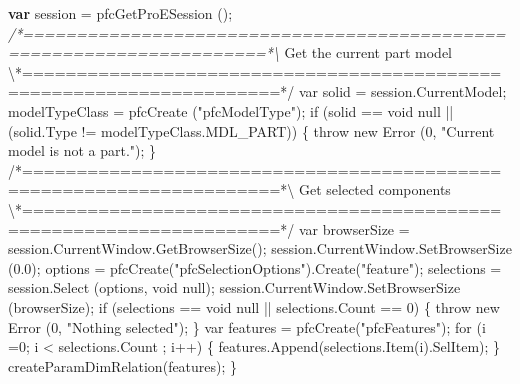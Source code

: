 \documentclass[]{article}
\newenvironment{Shaded}{}{}
\newcommand{\KeywordTok}[1]{\textcolor[rgb]{0.00,0.44,0.13}{\textbf{{#1}}}}
\newcommand{\FloatTok}[1]{\textcolor[rgb]{0.25,0.63,0.44}{{#1}}}
\newcommand{\CommentTok}[1]{\textcolor[rgb]{0.38,0.63,0.69}{\textit{{#1}}}}
\newcommand{\OtherTok}[1]{\textcolor[rgb]{0.00,0.44,0.13}{{#1}}}
\newcommand{\FunctionTok}[1]{\textcolor[rgb]{0.02,0.16,0.49}{{#1}}}
\newcommand{\NormalTok}[1]{{#1}}
\begin{document}
\begin{Shaded}
\begin{Highlighting}[]
    \KeywordTok{var} \NormalTok{session = }\FunctionTok{pfcGetProESession} \NormalTok{();}
    \CommentTok{/*=====================================================================*\textbackslash{}}
    \NormalTok{Get the current part model}
    \NormalTok{\textbackslash{}*=====================================================================*}\OtherTok{/      }
\OtherTok{    var solid = session.CurrentModel;}
\OtherTok{    modelTypeClass = pfcCreate }\FloatTok{(}\OtherTok{"pfcModelType"}\FloatTok{)}\OtherTok{;}
\OtherTok{    }
\OtherTok{    if }\FloatTok{(}\OtherTok{solid == void null }\FloatTok{||}\OtherTok{ }\FloatTok{(}\OtherTok{solid.Type != modelTypeClass.MDL_PART}\FloatTok{))}
\OtherTok{    \{}
\OtherTok{        throw new Error  }\FloatTok{(}\OtherTok{0, "Current model is not a part."}\FloatTok{)}\OtherTok{;}
\OtherTok{    \}}
\OtherTok{      }
\OtherTok{    /}\NormalTok{*=====================================================================*\textbackslash{}}
        \NormalTok{Get selected components}
    \NormalTok{\textbackslash{}*=====================================================================*}\OtherTok{/               }
\OtherTok{    var browserSize = session.CurrentWindow.GetBrowserSize}\FloatTok{()}\OtherTok{;}
\OtherTok{    session.CurrentWindow.SetBrowserSize }\FloatTok{(}\OtherTok{0.0}\FloatTok{)}\OtherTok{;}
\OtherTok{    }
\OtherTok{    options = pfcCreate}\FloatTok{(}\OtherTok{"pfcSelectionOptions"}\FloatTok{)}\OtherTok{.Create}\FloatTok{(}\OtherTok{"feature"}\FloatTok{)}\OtherTok{;}
\OtherTok{    selections = session.Select }\FloatTok{(}\OtherTok{options, void null}\FloatTok{)}\OtherTok{;}
\OtherTok{    }
\OtherTok{    session.CurrentWindow.SetBrowserSize }\FloatTok{(}\OtherTok{browserSize}\FloatTok{)}\OtherTok{;}
\OtherTok{    if }\FloatTok{(}\OtherTok{selections == void null }\FloatTok{||}\OtherTok{ selections.Count == 0}\FloatTok{)}
\OtherTok{    \{}
\OtherTok{        throw new Error  }\FloatTok{(}\OtherTok{0, "Nothing selected"}\FloatTok{)}\OtherTok{;}
\OtherTok{    \}}
\OtherTok{    }
\OtherTok{    var features = pfcCreate}\FloatTok{(}\OtherTok{"pfcFeatures"}\FloatTok{)}\OtherTok{;}
\OtherTok{    for }\FloatTok{(}\OtherTok{i =0; i < selections.Count ; i}\FloatTok{++)}
\OtherTok{    \{}
\OtherTok{        features.Append}\FloatTok{(}\OtherTok{selections.Item}\FloatTok{(}\OtherTok{i}\FloatTok{)}\OtherTok{.SelItem}\FloatTok{)}\OtherTok{;                        }
\OtherTok{    \}}
\OtherTok{    }
\OtherTok{    createParamDimRelation}\FloatTok{(}\OtherTok{features}\FloatTok{)}\OtherTok{;}
\OtherTok{    }
\OtherTok{\}}



\end{Highlighting}
\end{Shaded}
\end{document}
